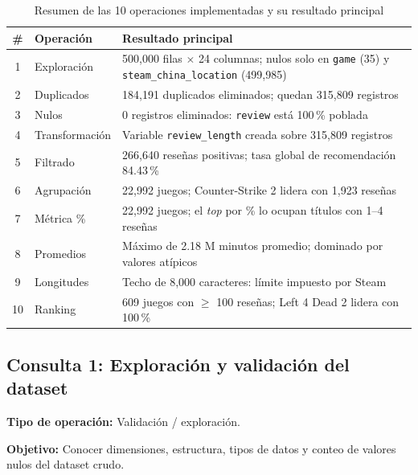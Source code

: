 \begin{table}[H]
\centering
\caption{Resumen de las 10 operaciones implementadas y su resultado principal}
\label{tab:resumen-consultas}
\vspace{0.2cm}
\small
\begin{tabular}{clp{7.4cm}}
\toprule
\textbf{\#} & \textbf{Operación} & \textbf{Resultado principal} \\
\midrule
1  & Exploración         & 500,000 filas $\times$ 24 columnas; nulos solo en \texttt{game} (35) y \texttt{steam\_\bk{}china\_\bk{}location} (499,985) \\
2  & Duplicados          & 184,191 duplicados eliminados; quedan 315,809 registros \\
3  & Nulos               & 0 registros eliminados: \texttt{review} está 100\,\% poblada \\
4  & Transformación      & Variable \texttt{review\_length} creada sobre 315,809 registros \\
5  & Filtrado            & 266,640 reseñas positivas; tasa global de recomendación 84.43\,\% \\
6  & Agrupación          & 22,992 juegos; Counter-Strike 2 lidera con 1,923 reseñas \\
7  & Métrica \%          & 22,992 juegos; el \textit{top} por \% lo ocupan títulos con 1--4 reseñas \\
8  & Promedios           & Máximo de 2.18 M minutos promedio; dominado por valores atípicos \\
9  & Longitudes          & Techo de 8,000 caracteres: límite impuesto por Steam \\
10 & Ranking             & 609 juegos con $\geq$ 100 reseñas; Left 4 Dead 2 lidera con 100\,\% \\
\bottomrule
\end{tabular}
\end{table}


\subsection{Consulta 1: Exploración y validación del dataset}

\textbf{Tipo de operación:} Validación / exploración.

\textbf{Objetivo:} Conocer dimensiones, estructura, tipos de datos y conteo de valores nulos del dataset crudo.


